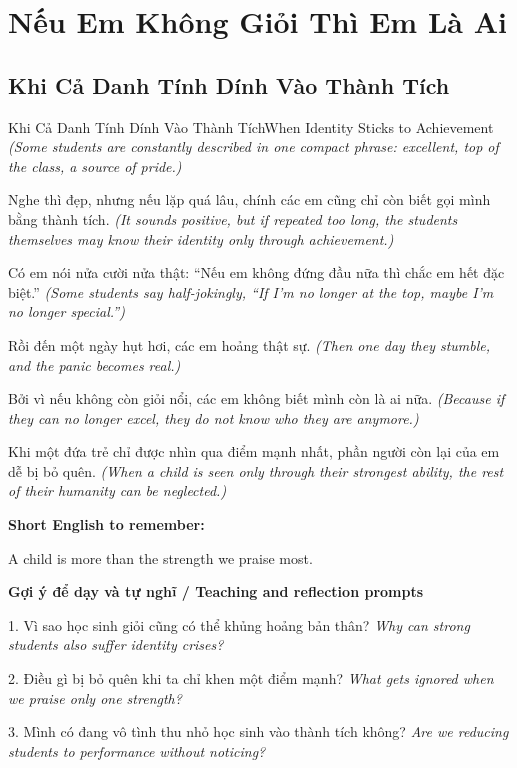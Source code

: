 \chapter{Nếu Em Không Giỏi Thì Em Là Ai}

\section{Khi Cả Danh Tính Dính Vào Thành Tích}
\begin{truyen}{Khi Cả Danh Tính Dính Vào Thành Tích}{When Identity Sticks to Achievement}
\textit{(Some students are constantly described in one compact phrase: excellent, top of the class, a source of pride.)}

Nghe thì đẹp, nhưng nếu lặp quá lâu, chính các em cũng chỉ còn biết gọi mình bằng thành tích.
\textit{(It sounds positive, but if repeated too long, the students themselves may know their identity only through achievement.)}

Có em nói nửa cười nửa thật: “Nếu em không đứng đầu nữa thì chắc em hết đặc biệt.”
\textit{(Some students say half-jokingly, “If I'm no longer at the top, maybe I'm no longer special.”)}

Rồi đến một ngày hụt hơi, các em hoảng thật sự.
\textit{(Then one day they stumble, and the panic becomes real.)}

Bởi vì nếu không còn giỏi nổi, các em không biết mình còn là ai nữa.
\textit{(Because if they can no longer excel, they do not know who they are anymore.)}

\end{truyen}

\begin{baihoc}
Khi một đứa trẻ chỉ được nhìn qua điểm mạnh nhất, phần người còn lại của em dễ bị bỏ quên.
\textit{(When a child is seen only through their strongest ability, the rest of their humanity can be neglected.)}
\end{baihoc}

\begin{ghinhoanh}
\textbf{Short English to remember:}

A child is more than the strength we praise most.

\end{ghinhoanh}

\begin{tuhocnhanh}
\textbf{Gợi ý để dạy và tự nghĩ / Teaching and reflection prompts}

1. Vì sao học sinh giỏi cũng có thể khủng hoảng bản thân? \textit{Why can strong students also suffer identity crises?}

2. Điều gì bị bỏ quên khi ta chỉ khen một điểm mạnh? \textit{What gets ignored when we praise only one strength?}

3. Mình có đang vô tình thu nhỏ học sinh vào thành tích không? \textit{Are we reducing students to performance without noticing?}
\end{tuhocnhanh}
\ngancach

